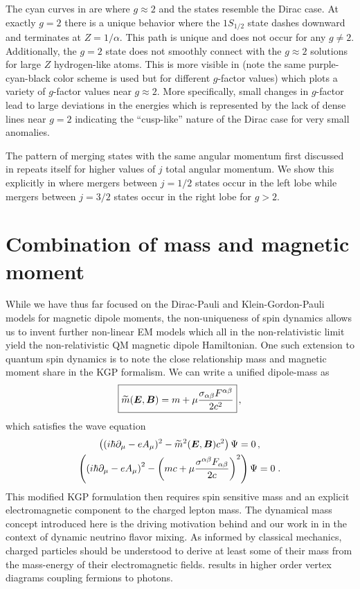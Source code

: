 The cyan curves in  are where $g\approx2$ and the states resemble the Dirac case. At exactly $g\!=\!2$ there is a unique behavior where the $1S_{1/2}$ state dashes downward and terminates at $Z\!=\!1/\alpha$. This path is unique and does not occur for any $g\neq2$. Additionally, the $g\!=\!2$ state does not smoothly connect with the $g\approx2$ solutions for large $Z$ hydrogen-like atoms. This is more visible in  (note the same purple-cyan-black color scheme is used but for different $g$-factor values) which plots a variety of $g$-factor values near $g\approx2$. More specifically, small changes in $g$-factor lead to large deviations in the energies which is represented by the lack of dense lines near $g\!=\!2$ indicating the ``cusp-like'' nature of the Dirac case for very small anomalies.

The pattern of merging states with the same angular momentum first discussed in  repeats itself for higher values of $j$ total angular momentum. We show this explicitly in  where mergers between $j=1/2$ states occur in the left lobe while mergers between $j=3/2$ states occur in the right lobe for $g>2$.

\section{Combination of mass and magnetic moment}
\label{sec:ikgp}
While we have thus far focused on the Dirac-Pauli and Klein-Gordon-Pauli models for magnetic dipole moments, the non-uniqueness of spin dynamics allows us to invent further non-linear EM models which all in the non-relativistic limit yield the non-relativistic QM magnetic dipole Hamiltonian. One such extension to quantum spin dynamics is to note the close relationship mass and magnetic moment share in the KGP formalism. We can write a unified dipole-mass as
\begin{alignat}{1}
    \label{eq:ext:01} \boxed{\widetilde{m}(\boldsymbol{E},\boldsymbol{B}) = m +\mu\frac{\sigma_{\alpha\beta}F^{\alpha\beta}}{2c^{2}}}\,,
\end{alignat}
which satisfies the wave equation
\begin{gather}
\label{eq:ext:02} \left((i\hbar\partial_{\mu}-eA_{\mu})^{2}-\widetilde{m}^{2}(\boldsymbol{E},\boldsymbol{B})c^{2}\right)\Psi=0\,,\\
\label{IKGP01} \left(\left(i\hbar\partial_{\mu}-eA_{\mu}\right)^{2}-\left(mc+\mu\frac{\sigma^{\alpha\beta}F_{\alpha\beta}}{2c}\right)^{2}\right)\Psi=0\;.
\end{gather}
This modified KGP formulation then requires spin sensitive mass and an explicit electromagnetic component to the charged lepton mass. The dynamical mass concept introduced here is the driving motivation behind  and our work in \cite{Steinmetz:2023nsc} in the context of dynamic neutrino flavor mixing. As informed by classical mechanics, charged particles should be understood to derive at least some of their mass from the mass-energy of their electromagnetic fields.  results in higher order vertex diagrams coupling fermions to photons.

